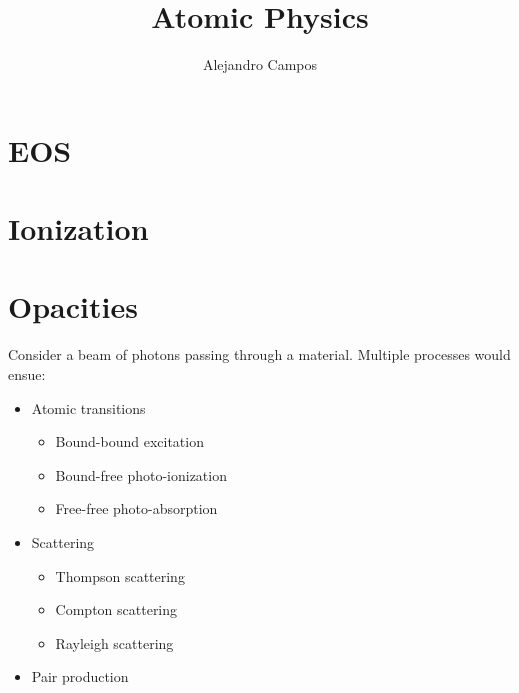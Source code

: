 \documentclass[a4paper,11pt]{report}
\title{Atomic Physics}
\author{Alejandro Campos}
\begin{document}
\maketitle
\tableofcontents

\chapter{EOS}

\chapter{Ionization}

\chapter{Opacities}
Consider a beam of photons passing through a material. Multiple processes would ensue:
\begin{itemize}
    \item Atomic transitions
    \begin{itemize}
        \item Bound-bound excitation
        \item Bound-free photo-ionization
        \item Free-free photo-absorption
    \end{itemize}
    \item Scattering
    \begin{itemize}
        \item Thompson scattering
        \item Compton scattering
        \item Rayleigh scattering
    \end{itemize}
    \item Pair production
\end{itemize}
\end{document}

